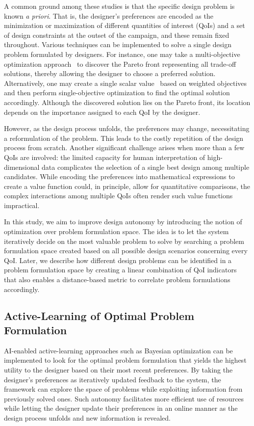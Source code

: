 \documentclass[final,5p,times,twocolumn]{elsarticle}
\begin{document}
A common ground among these studies is that the specific design problem is known \emph{a priori}. That is, the designer's preferences are encoded as the minimization or maximization of different quantities of interest (QoIs) and a set of design constraints at the outset of the campaign, and these remain fixed throughout. Various techniques can be implemented to solve a single design problem formulated by designers. For instance, one may take a multi-objective optimization approach~\cite{deb2011multi,konak2006multi,mingqiang2000ga,nedjah2015evolutionary,khatamsaz2021bayesian,arroyave2022perspective,alvi2024hierarchical} to discover the Pareto front representing all trade-off solutions, thereby allowing the designer to choose a preferred solution. Alternatively, one may create a single scalar value~\cite{knowles2006parego,hakanen2017using} based on weighted objectives and then perform single-objective optimization to find the optimal solution accordingly. Although the discovered solution lies on the Pareto front, its location depends on the importance assigned to each QoI by the designer.

However, as the design process unfolds, the preferences may change, necessitating a reformulation of the problem. This leads to the costly repetition of the design process from scratch. Another significant challenge arises when more than a few QoIs are involved: the limited capacity for human interpretation of high-dimensional data complicates the selection of a single best design among multiple candidates. While encoding the preferences into mathematical expressions to create a value function could, in principle, allow for quantitative comparisons, the complex interactions among multiple QoIs often render such value functions impractical.

In this study, we aim to improve design autonomy by introducing the notion of optimization over problem formulation space. The idea is to let the system iteratively decide on the most valuable problem to solve by searching a problem formulation space created based on all possible design scenarios concerning every QoI. Later, we describe how different design problems can be identified in a problem formulation space by creating a linear combination of QoI indicators that also enables a distance-based metric to correlate problem formulations accordingly.

\subsection{Active-Learning of Optimal Problem Formulation}
AI-enabled active-learning approaches such as Bayesian optimization can be implemented to look for the optimal problem formulation that yields the highest utility to the designer based on their most recent preferences. By taking the designer's preferences as iteratively updated feedback to the system, the framework can explore the space of problems while exploiting information from previously solved ones. Such autonomy facilitates more efficient use of resources while letting the designer update their preferences in an online manner as the design process unfolds and new information is revealed.
\end{document}
